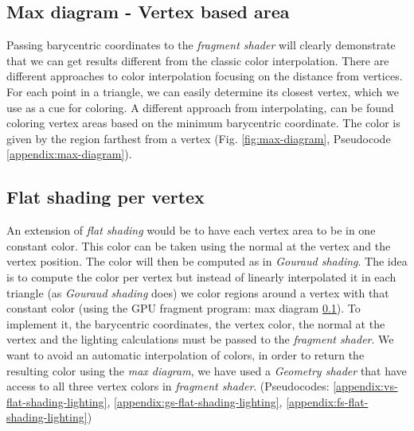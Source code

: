 
\subsection{Max diagram - Vertex based area} \label{section:max-diagram}
Passing barycentric coordinates to the \textit{fragment shader} will clearly demonstrate that we can get results different from the classic color interpolation.
\cite{WEBSITE:redbloggames}
There are different approaches to color interpolation focusing on the distance from vertices. For each point in a triangle, we can easily determine its closest vertex, which we use as a cue for coloring.
A different approach from interpolating, can be found coloring vertex areas based on the minimum barycentric coordinate.
The color is given by the region farthest from a vertex (Fig. \ref{fig:max-diagram}, Pseudocode \ref{appendix:max-diagram}).


\subsection{Flat shading per vertex} \label{section:extend-flat-shading-lighting}
An extension of \textit{flat shading} would be to have each vertex area to be in one constant color. This color can be taken using the normal at the vertex and the vertex position.
The color will then be computed as in \textit{Gouraud shading}.
The idea is to compute the color per vertex but instead of linearly interpolated it in each triangle (as \textit{Gouraud shading} does) we color regions around a vertex with that constant color (using the GPU fragment program: max diagram \ref{section:max-diagram}).
To implement it, the barycentric coordinates, the vertex color, the normal at the vertex and the lighting calculations must be passed to the \textit{fragment shader}.
We want to avoid an automatic interpolation of colors, in order to return the resulting color using the \textit{max diagram}, we have used a \textit{Geometry shader} that have access to all three vertex colors in \textit{fragment shader}. (Pseudocodes: \ref{appendix:vs-flat-shading-lighting}, \ref{appendix:gs-flat-shading-lighting}, \ref{appendix:fs-flat-shading-lighting})

